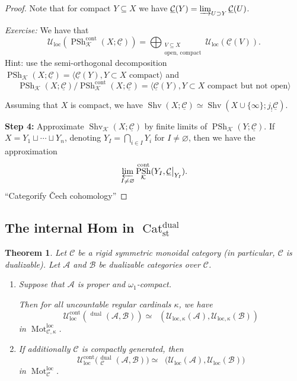\documentclass[draft]{amsart}
\newcommand{\ul}[1]{\underline{#1}}
\newcommand{\cat}[1]{\mathcal{#1}}
\newcommand{\sheaf}[1]{\mathcal{#1}}
\renewcommand{\emptyset}{\varnothing}
\DeclareMathOperator{\iHom}{\ul{Hom}}
\DeclareMathOperator{\Shv}{Shv}
\DeclareMathOperator{\Cat}{Cat}
\DeclareMathOperator{\PSh}{PSh}
\DeclareMathOperator{\Mot}{Mot}
\newtheorem{thm}{Theorem}[section]
\theoremstyle{definition}
\begin{document}
\begin{proof}
Note that for compact $Y\subseteq X$ we have $\ul{\cat C}(Y) = \varinjlim_{U\supset Y} \ul{\cat C}(U)$.

\textit{Exercise:} We have that 
\[
\sheaf U_{\mathrm{loc}}(\PSh^{\mathrm{cont}}_{\sheaf K}(X;\ul{\cat C}))
= \bigoplus_{\substack{V\subseteq X\\ \text{open, compact}}} \sheaf U_{\mathrm{loc}}(\ul{\cat C}(V)).
\]
Hint: use the semi-orthogonal decomposition $\PSh_{\sheaf K}(X;\ul{\cat C}) = \langle \ul{\cat C}(Y), Y\subset X \text{ compact}\rangle$ and
\[
\PSh_{\sheaf K}(X;\ul{\cat C})/\PSh_{\sheaf K}^{\mathrm{cont}}(X;\ul{\cat C}) = \langle \ul{\cat C}(Y), \text{$Y\subset X$ compact but not open}\rangle
\]


Assuming that $X$ is compact, we have $\Shv(X;\ul{\cat C}) \simeq \Shv(X\cup\{\infty\}; j_!\ul{\cat C})$.

\textbf{Step 4:} Approximate $\Shv_{\sheaf K}(X;\ul{\cat C})$ by finite limits of $\PSh_{\sheaf K}(Y;\ul{\cat C})$. If $X = Y_1 \sqcup \dotsb \sqcup Y_n$, denoting $Y_I = \bigcap_{i\in I}Y_i$ for $I\neq \emptyset$, then we have the approximation
\[
\varprojlim_{I\neq \emptyset} \PSh^{\mathrm{cont}}_{\sheaf K}(Y_I, \ul{\cat C}\big|_{Y_I}).
\]
\enquote{Categorify \v{C}ech cohomology}
\end{proof}

\subsection{The internal Hom in \texorpdfstring{$\Cat^{\mathrm{dual}}_{\mathrm{st}}$}{Cat perf dual}}

\begin{thm}
Let $\cat C$ be a rigid symmetric monoidal category (in particular, $\cat C$ is dualizable). Let $\cat A$ and $\cat B$ be dualizable categories over $\cat C$. 

\begin{enumerate}[(1)]
\item Suppose that $\cat A$ is proper and $\omega_1$-compact. 

Then for all uncountable regular cardinals $\kappa$, we have
\[
\sheaf U_{\mathrm{loc}}^{\mathrm{cont}}(\iHom^{\mathrm{dual}}(\cat A, \cat B)) \simeq \iHom(\sheaf U_{\mathrm{loc}, \kappa}(\cat A), \sheaf U_{\mathrm{loc},\kappa} (\cat B))
\]
in $\Mot_{\cat C, \kappa}^{\mathrm{loc}}$.

\item If additionally $\cat C$ is compactly generated, then
\[
\sheaf U_{\mathrm{loc}}^{\mathrm{cont}} \bigl(\iHom_{\cat C}^{\mathrm{dual}} (\cat A, \cat B)\bigr) \simeq \iHom\bigl(\sheaf U_{\mathrm{loc}}(\cat A), \sheaf U_{\mathrm{loc}}(\cat B)\bigr)
\]
in $\Mot_{\cat C}^{\mathrm{loc}}$.
\end{enumerate}
\end{thm}
\end{document}
